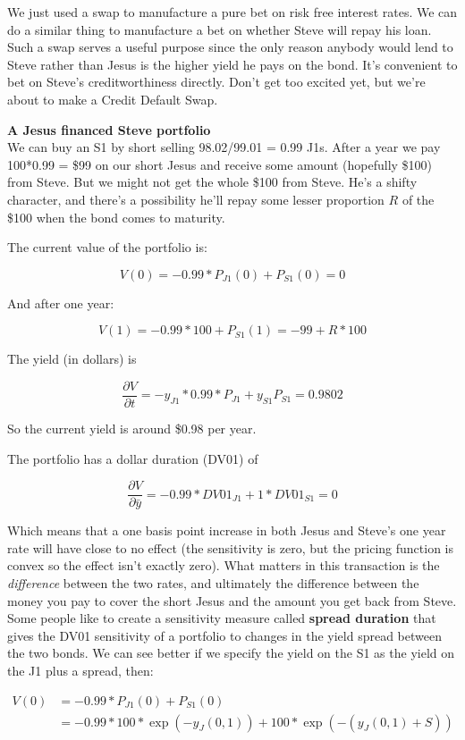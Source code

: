 We just used a swap to manufacture a pure bet on risk free interest rates. We can do a similar thing to manufacture a bet on whether Steve will repay his loan. Such a swap serves a useful purpose since the only reason anybody would lend to Steve rather than Jesus is the higher yield he pays on the bond. It's convenient to bet on Steve's creditworthiness directly.  Don't get too excited yet, but we're about to make a Credit Default Swap.

\textbf{A Jesus financed Steve portfolio}\\

We can buy an S1 by short selling 98.02/99.01 = 0.99 J1s. After a year we pay 100*0.99 = \$99 on our short Jesus and receive some amount (hopefully \$100) from Steve. But we might not get the whole \$100 from Steve. He's a shifty character, and there's a possibility he'll repay some lesser proportion $R$ of the \$100 when the bond comes to maturity. 

The current value of the portfolio is:

\[V(0) = -0.99*P_{J1}(0)+P_{S1}(0) = 0 \]

And after one year:

\[V(1) = -0.99*100 + P_{S1}(1)  = -99+ R*100 \]

The yield (in dollars) is

\[ \frac{\partial V}{\partial t}  = -y_{J1}*0.99*P_{J1}+y_{S1}P_{S1} = 0.9802 \]

So the current yield is around \$0.98 per year.

The portfolio has a dollar duration (DV01) of 

\[ \frac{\partial V}{\partial \bar{y}} =  -0.99*DV01_{J1}+1*DV01_{S1} = 0  \]
 
Which means that a one basis point increase in both Jesus and Steve's one year rate will have close to no effect (the sensitivity is zero, but the pricing function is convex so the effect isn't exactly zero). What matters in this transaction is the \textit{difference} between the  two rates, and ultimately the difference between the money you pay to cover the short Jesus and the amount you get back from Steve. Some people like to create a sensitivity measure called \textbf{spread duration} that gives the DV01 sensitivity of a portfolio to changes in the yield spread between the two bonds.  We can see better if we specify the yield on the S1 as the yield on the J1 plus a spread, then:

\begin{eqnarray*}
V(0) &= -0.99*P_{J1}(0) + P_{S1}(0)\\
 &= -0.99*100*\exp(-y_J(0,1))+100*\exp(-(y_J(0,1)+S)) 
 \end{eqnarray*}

